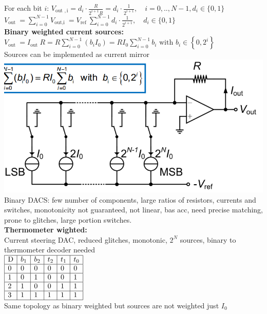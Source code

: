 \documentclass[5pt]{article}
\begin{document}
\begin{multicols*}{4}
For each bit $ i $: $ V_{\text {out }, \mathrm{i}}=d_{i} \cdot \frac{R}{2^{i+1} R}=d_{i} \cdot \frac{1}{2^{i+1}}, \quad i=0, . ., N-1, d_{i} \in\{0,1\} $\\
$ V_{\text {out }}=\sum_{i=0}^{N-1} V_{\text {out,i }}=V_{\text {ref }} \sum_{i=0}^{N-1} d_{i} \cdot \frac{1}{2^{i+1}}, \quad d_{i} \in\{0,1\} $\\
\textbf{Binary weighted current sources:}\\
$ V_{\text {out }}=I_{\text {out }} R=R \sum_{i=0}^{N-1}\left(b_{i} I_{0}\right)=R I_{0} \sum_{i=0}^{N-1} b_{i} \text { with } b_{i} \in\left\{0,2^{i}\right\} $\\
Sources can be implemented as current mirror\\
\includegraphics[width=\columnwidth]{images/dac_binary_current_sources.png}
Binary DACS: few number of components, large ratios of resistors, currents and switches, monotonicity not guaranteed, not linear, bas acc, need precise matching, prone to glitches, large portion switches.\\
\textbf{Thermometer wighted:}\\
Current steering DAC, reduced glitches, monotonic, $ 2^N $ sources, binary to thermometer decoder needed\\
$ \begin{array}{|l|l|l|l|l|l|}
\hline \mathrm{D} & b_{1} & b_{2} & t_{2} & t_{1} & t_{0} \\
\hline 0 & 0 & 0 & 0 & 0 & 0 \\
\hline 1 & 0 & 1 & 0 & 0 & 1 \\
\hline 2 & 1 & 0 & 0 & 1 & 1 \\
\hline 3 & 1 & 1 & 1 & 1 & 1 \\
\hline
\end{array} $\\
Same topology as binary weighted but sources are not weighted just $ I_0 $\\

\end{multicols*}
\end{document}
